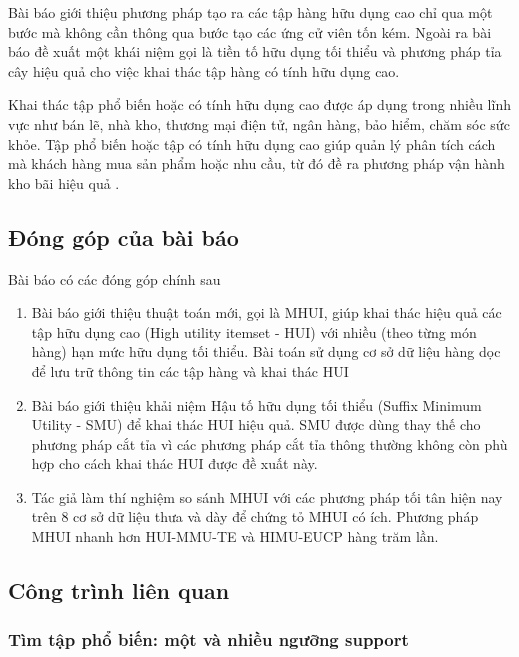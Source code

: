 Bài báo giới thiệu phương pháp tạo ra các tập hàng hữu dụng cao chỉ qua một bước mà không cần thông qua bước tạo các ứng cử viên tốn kém. Ngoài ra bài báo đề xuất một khái niệm gọi là tiền tố hữu dụng tối thiểu và phương pháp tỉa cây hiệu quả cho việc khai thác tập hàng có tính hữu dụng cao. 

Khai thác tập phổ biến hoặc có tính hữu dụng cao được áp dụng trong nhiều lĩnh vực như bán lẽ, nhà kho, thương mại điện tử, ngân hàng, bảo hiểm, chăm sóc sức khỏe. Tập phổ biến hoặc tập có tính hữu dụng cao giúp quản lý phân tích cách mà khách hàng mua sản phẩm hoặc nhu cầu, từ đó đề ra phương pháp vận hành kho bãi hiệu quả \cite{chen2005aggregation, chen2005association}.

\subsection{Đóng góp của bài báo}

Bài báo có các đóng góp chính sau

\begin{enumerate}
  \item Bài báo giới thiệu thuật toán mới, gọi là MHUI, giúp khai thác hiệu quả các tập hữu dụng cao (High utility itemset - HUI) với nhiều (theo từng món hàng) hạn mức hữu dụng tối thiểu. Bài toán sử dụng cơ sở dữ liệu hàng dọc để lưu trữ thông tin các tập hàng và khai thác HUI
  \item Bài báo giới thiệu khải niệm Hậu tố hữu dụng tối thiểu (Suffix Minimum Utility - SMU) để khai thác HUI hiệu quả. SMU được dùng thay thế cho phương pháp cắt tỉa vì các phương pháp cắt tỉa thông thường không còn phù hợp cho cách khai thác HUI được đề xuất này.
  \item Tác giả làm thí nghiệm so sánh MHUI với các phương pháp tối tân hiện nay trên 8 cơ sở dữ liệu thưa và dày để chứng tỏ MHUI có ích. Phương pháp MHUI nhanh hơn HUI-MMU-TE \cite{lin2016efficient} và HIMU-EUCP \cite{gan2016more} hàng trăm lần.  
\end{enumerate}

\subsection{Công trình liên quan}

\subsubsection{Tìm tập phổ biến: một và nhiều ngưỡng support}

